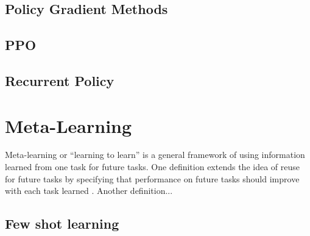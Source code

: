 \subsection{Policy Gradient Methods}
\subsection{PPO}
\subsection{Recurrent Policy}
\section{Meta-Learning}
Meta-learning or ``learning to learn'' is a general framework of using
information learned from one task for future tasks. One definition extends the 
idea of reuse for future tasks by specifying that performance on future tasks
should improve with each task learned \cite{ThrunPratt:98}. Another definition...
\subsection{Few shot learning}
